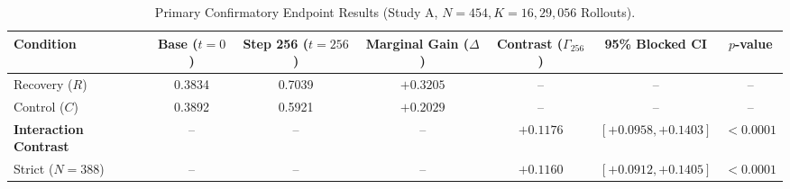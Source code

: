 \begin{table}[t]
\centering
\caption{Primary Confirmatory Endpoint Results (Study A, $N=454, K=16, 29,056$ Rollouts).}
\label{tab:endpoint}
\begin{tabular}{lcccccc}
\toprule
Condition & Base ($t=0$) & Step 256 ($t=256$) & Marginal Gain ($\Delta$) & Contrast ($\Gamma_{256}$) & 95\% Blocked CI & $p$-value \\
\midrule
Recovery ($R$) & 0.3834 & 0.7039 & $+0.3205$ & -- & -- & -- \\
Control ($C$)  & 0.3892 & 0.5921 & $+0.2029$ & -- & -- & -- \\
\midrule
\textbf{Interaction Contrast} & -- & -- & -- & \textbf{$+0.1176$} & \textbf{$[+0.0958, +0.1403]$} & \textbf{$< 0.0001$} \\
Strict ($N=388$) & -- & -- & -- & \textbf{$+0.1160$} & \textbf{$[+0.0912, +0.1405]$} & \textbf{$< 0.0001$} \\
\bottomrule
\end{tabular}
\end{table}
